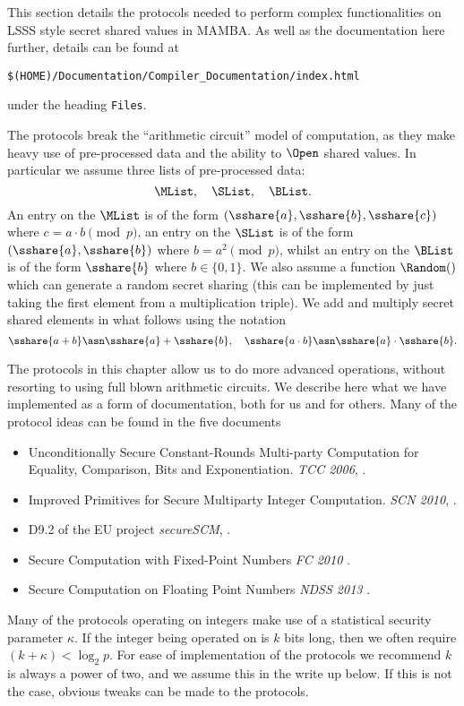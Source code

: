 This section details the protocols needed to perform complex
functionalities on LSSS style secret shared values in MAMBA.
As well as the documentation here further, details can be
found at
\begin{center}
  \verb+$(HOME)/Documentation/Compiler_Documentation/index.html+
\end{center}
under the heading \verb+Files+.

The protocols break the ``arithmetic circuit'' model of computation,
as they make heavy use of pre-processed data and the ability
to $\Open$ shared values.
In particular we assume three lists of pre-processed data:
\[ \MList, \quad \SList, \quad \BList. \]
An entry on the $\MList$ is of the form
$(\sshare{a}, \sshare{b}, \sshare{c})$ where $c=a \cdot b \pmod{p}$,
an entry on the $\SList$ is of the form
$(\sshare{a}, \sshare{b})$ where $b=a^2 \pmod{p}$,
whilst an entry on the $\BList$ is of the form
$\sshare{b}$ where $b \in \{0,1\}$.
We also assume a function $\Random()$ which can generate
a random secret sharing (this can be implemented by just taking
the first element from a multiplication triple).
We add and multiply secret shared elements in what follows
using the notation
\[ \sshare{a+b} \asn \sshare{a}+\sshare{b}, \quad
  \sshare{a\cdot b} \asn \sshare{a} \cdot \sshare{b}.
\]

The protocols in this chapter allow us to do more advanced operations,
without resorting to using full blown arithmetic circuits.
We describe here what we have implemented as a form of
documentation, both for us and for others.
Many of the protocol ideas can be found in the five
documents
\begin{itemize}
  \item Unconditionally Secure Constant-Rounds
        Multi-party Computation for Equality, Comparison, Bits and Exponentiation.
          {\em TCC 2006}, \cite{DFKNT06}.
  \item Improved Primitives for Secure Multiparty Integer Computation.
          {\em SCN 2010}, \cite{CH10}.
  \item D9.2 of the EU project {\em secureSCM}, \cite{SSCM}.
  \item Secure Computation with Fixed-Point Numbers {\em FC 2010} \cite{CS10}.
  \item Secure Computation on Floating Point Numbers {\em NDSS 2013} \cite{ABZS13}.
\end{itemize}
Many of the protocols operating on integers make use of a statistical security
parameter $\kappa$.
If the integer being operated on is $k$ bits long, then we often require $(k+\kappa)<\log_2 p$.
For ease of implementation of the protocols we recommend $k$ is
always a power of two, and we assume this in the write up below.
If this is not the case, obvious tweaks can be made to the protocols.

